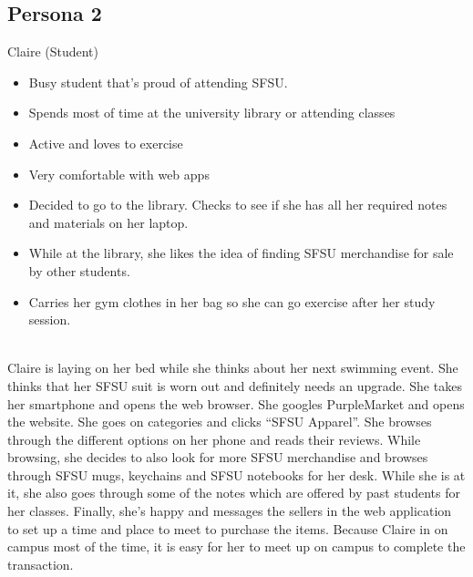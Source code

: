\subsection{Persona 2}
\begin{description}[font=\bfseries\itshape]
\item[Actor:]Claire (Student)
\item[About:]\hfill
\begin{itemize}[leftmargin=0mm]
\item Busy student that's proud of attending SFSU.
\item Spends most of time at the university library or attending classes
\item Active and loves to exercise
\item Very comfortable with web apps
\end{itemize}
\item[Goals \& Scenario:]\hfill
\begin{itemize}[leftmargin=0mm]
\item Decided to go to the library. Checks to see if she has all her required notes and materials on her laptop.
\item While at the library, she likes the idea of finding SFSU merchandise for sale by other students.
\item Carries her gym clothes in her bag so she can go exercise after her study session.
\end{itemize}
\item[Use Case:]\hfill\\
Claire is laying on her bed while she thinks about her next swimming event. She thinks that her SFSU suit is worn out and definitely needs an upgrade. She takes her smartphone and opens the web browser. She googles PurpleMarket and opens the website. She goes on categories and clicks “SFSU Apparel”. She browses through the different options on her phone and reads their reviews. While browsing, she decides to also look for more SFSU merchandise and browses through SFSU mugs, keychains and SFSU notebooks for her desk. While she is at it, she also goes through some of the notes which are offered by past students for her classes. Finally, she’s happy and messages the sellers in the web application to set up a time and place to meet to purchase the items.  Because Claire in on campus most of the time, it is easy for her to meet up on campus to complete the transaction.\end{description}

